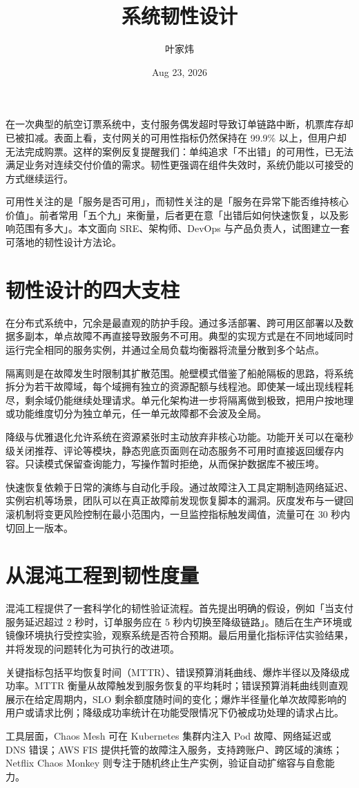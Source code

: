 \title{系统韧性设计}
\author{叶家炜}
\date{Aug 23, 2026}
\maketitle
在一次典型的航空订票系统中，支付服务偶发超时导致订单链路中断，机票库存却已被扣减。表面上看，支付网关的可用性指标仍然保持在 99.9\%{} 以上，但用户却无法完成购票。这样的案例反复提醒我们：单纯追求「不出错」的可用性，已无法满足业务对连续交付价值的需求。韧性更强调在组件失效时，系统仍能以可接受的方式继续运行。\par
可用性关注的是「服务是否可用」，而韧性关注的是「服务在异常下能否维持核心价值」。前者常用「五个九」来衡量，后者更在意「出错后如何快速恢复，以及影响范围有多大」。本文面向 SRE、架构师、DevOps 与产品负责人，试图建立一套可落地的韧性设计方法论。\par
\chapter{韧性设计的四大支柱}
在分布式系统中，冗余是最直观的防护手段。通过多活部署、跨可用区部署以及数据多副本，单点故障不再直接导致服务不可用。典型的实现方式是在不同地域同时运行完全相同的服务实例，并通过全局负载均衡器将流量分散到多个站点。\par
隔离则是在故障发生时限制其扩散范围。舱壁模式借鉴了船舱隔板的思路，将系统拆分为若干故障域，每个域拥有独立的资源配额与线程池。即使某一域出现线程耗尽，剩余域仍能继续处理请求。单元化架构进一步将隔离做到极致，把用户按地理或功能维度切分为独立单元，任一单元故障都不会波及全局。\par
降级与优雅退化允许系统在资源紧张时主动放弃非核心功能。功能开关可以在毫秒级关闭推荐、评论等模块，静态兜底页面则在动态服务不可用时直接返回缓存内容。只读模式保留查询能力，写操作暂时拒绝，从而保护数据库不被压垮。\par
快速恢复依赖于日常的演练与自动化手段。通过故障注入工具定期制造网络延迟、实例宕机等场景，团队可以在真正故障前发现恢复脚本的漏洞。灰度发布与一键回滚机制将变更风险控制在最小范围内，一旦监控指标触发阈值，流量可在 30 秒内切回上一版本。\par
\chapter{从混沌工程到韧性度量}
混沌工程提供了一套科学化的韧性验证流程。首先提出明确的假设，例如「当支付服务延迟超过 2 秒时，订单服务应在 5 秒内切换至降级链路」。随后在生产环境或镜像环境执行受控实验，观察系统是否符合预期。最后用量化指标评估实验结果，并将发现的问题转化为可执行的改进项。\par
关键指标包括平均恢复时间（MTTR）、错误预算消耗曲线、爆炸半径以及降级成功率。MTTR 衡量从故障触发到服务恢复的平均耗时；错误预算消耗曲线则直观展示在给定周期内，SLO 剩余额度随时间的变化；爆炸半径量化单次故障影响的用户或请求比例；降级成功率统计在功能受限情况下仍被成功处理的请求占比。\par
工具层面，Chaos Mesh 可在 Kubernetes 集群内注入 Pod 故障、网络延迟或 DNS 错误；AWS FIS 提供托管的故障注入服务，支持跨账户、跨区域的演练；Netflix Chaos Monkey 则专注于随机终止生产实例，验证自动扩缩容与自愈能力。\par
